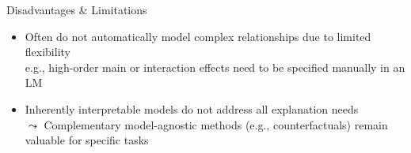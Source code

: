 \documentclass[11pt,compress,t,notes=noshow, aspectratio=169, xcolor=table]{beamer}
\begin{document}
\begin{frame}{Disadvantages \& Limitations}
\begin{itemize}
\itemsep1em
        \item<3-> 
        Often do not automatically model complex relationships due to limited flexibility
        \\
        e.g., high-order main or interaction effects need to be specified manually in an LM

     \item<4-> Inherently interpretable models do not address all explanation needs\\
$\leadsto$ Complementary model-agnostic methods (e.g., counterfactuals) remain valuable for specific tasks
\end{itemize}
\end{frame}
\end{document}
